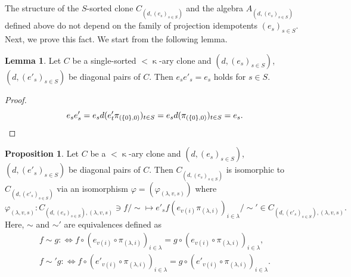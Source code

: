 \documentclass[a4paper,10pt]{article}
\theoremstyle{definition}
\newtheorem{lem}[df]{Lemma}
\newtheorem{prop}[df]{Proposition}
\newcommand\ph{\varphi}
\newcommand\mc{\mathclose}
\begin{document}
The structure of the $S$-sorted clone $C_{(d,(e_s)_{s\in S})}$ and 
the algebra $A_{(d,(e_s)_{s\in S})}$
defined above do not
depend on the family of projection idempotents $(e_s)_{s\in S}$.
Next, we prove this fact.
We start from the following lemma.
\begin{lem}\label{different-projection}
Let $C$ be a single-sorted $<\mc\kappa$-ary clone and ${(d,(e_s)_{s\in S})}$, ${(d,(e'_s)_{s\in S})}$
be diagonal pairs of $C$.
Then $e_se'_s=e_s$ holds for $s\in S$.
\end{lem}
\begin{proof}
\[
e_se'_s=e_sd(e'_t\pi_{(\{0\},0)})_{t\in S}=e_sd(\pi_{(\{0\},0)})_{t\in S}=e_s.
\qedhere
\]
\end{proof}
\begin{prop}
Let $C$ be a $<\mc\kappa$-ary clone and ${(d,(e_s)_{s\in S})}$, ${(d,(e'_s)_{s\in S})}$
be diagonal pairs of $C$.
Then $C_{(d,(e_s)_{s\in S})}$ is isomorphic to  $C_{(d,(e'_s)_{s\in S})}$ via an isomorphism
$\ph=(\ph_{(\lambda,v,s)})$ where
\[
\ph_{(\lambda,v,s)}:C_{(d,(e_s)_{s\in S}),(\lambda,v,s)}\ni f/\mc \sim\mapsto 
e'_sf(e_{v(i)}\pi_{(\lambda,i)})_{i\in\lambda}/\mc\sim'
\in C_{(d,(e'_s)_{s\in S}),(\lambda,v,s)}.
\]
Here, $\sim$ and $\sim'$ are equivalences defined as
\begin{align*}
f\sim g:\Longleftrightarrow 
  f\circ (e_{v(i)}\circ \pi_{(\lambda,i)})_{i\in\lambda}
 =g\circ (e_{v(i)}\circ \pi_{(\lambda,i)})_{i\in\lambda},\\
f\sim' g:\Longleftrightarrow 
  f\circ (e'_{v(i)}\circ \pi_{(\lambda,i)})_{i\in\lambda}
 =g\circ (e'_{v(i)}\circ \pi_{(\lambda,i)})_{i\in\lambda}.
\end{align*}
\end{prop}
\end{document}
